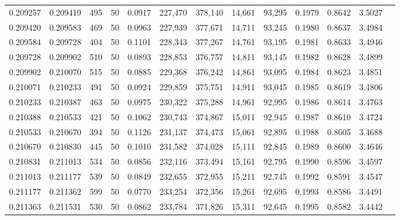 \begin{tabular}{rrrrrrrrrrrrr}
0.209257 & 0.209419 &   495 &  50 &                                     0.0917 & 227,470 & 378,140 &  14,661 &  93,295 & 0.1979 & 0.8642 & 3.5027 \\
0.209420 & 0.209583 &   469 &  50 &                                     0.0963 & 227,939 & 377,671 &  14,711 &  93,245 & 0.1980 & 0.8637 & 3.4984 \\
0.209584 & 0.209728 &   404 &  50 &                                     0.1101 & 228,343 & 377,267 &  14,761 &  93,195 & 0.1981 & 0.8633 & 3.4946 \\
0.209728 & 0.209902 &   510 &  50 &                                     0.0893 & 228,853 & 376,757 &  14,811 &  93,145 & 0.1982 & 0.8628 & 3.4899 \\
0.209902 & 0.210070 &   515 &  50 &                                     0.0885 & 229,368 & 376,242 &  14,861 &  93,095 & 0.1984 & 0.8623 & 3.4851 \\
0.210071 & 0.210233 &   491 &  50 &                                     0.0924 & 229,859 & 375,751 &  14,911 &  93,045 & 0.1985 & 0.8619 & 3.4806 \\
0.210233 & 0.210387 &   463 &  50 &                                     0.0975 & 230,322 & 375,288 &  14,961 &  92,995 & 0.1986 & 0.8614 & 3.4763 \\
0.210388 & 0.210533 &   421 &  50 &                                     0.1062 & 230,743 & 374,867 &  15,011 &  92,945 & 0.1987 & 0.8610 & 3.4724 \\
0.210533 & 0.210670 &   394 &  50 &                                     0.1126 & 231,137 & 374,473 &  15,061 &  92,895 & 0.1988 & 0.8605 & 3.4688 \\
0.210670 & 0.210830 &   445 &  50 &                                     0.1010 & 231,582 & 374,028 &  15,111 &  92,845 & 0.1989 & 0.8600 & 3.4646 \\
0.210831 & 0.211013 &   534 &  50 &                                     0.0856 & 232,116 & 373,494 &  15,161 &  92,795 & 0.1990 & 0.8596 & 3.4597 \\
0.211013 & 0.211177 &   539 &  50 &                                     0.0849 & 232,655 & 372,955 &  15,211 &  92,745 & 0.1992 & 0.8591 & 3.4547 \\
0.211177 & 0.211362 &   599 &  50 &                                     0.0770 & 233,254 & 372,356 &  15,261 &  92,695 & 0.1993 & 0.8586 & 3.4491 \\
0.211363 & 0.211531 &   530 &  50 &                                     0.0862 & 233,784 & 371,826 &  15,311 &  92,645 & 0.1995 & 0.8582 & 3.4442 \\

\end{tabular}
